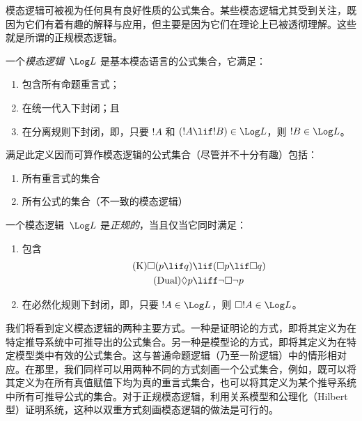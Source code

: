 \documentclass[../../../include/open-logic-section]{subfiles}
\begin{document}


模态逻辑可被视为任何具有良好性质的公式集合。某些模态逻辑尤其受到关注，既因为它们有着有趣的解释与应用，但主要是因为它们在理论上已被透彻理解。这些就是所谓的正规模态逻辑。

\begin{defn}
一个\emph{模态逻辑}~$\Log L$ 是基本模态语言的公式集合，它满足：
\begin{enumerate}
\item 包含所有命题重言式；
\item 在统一代入下封闭；且
\item 在分离规则下封闭，即，只要 $!A$ 和 $(!A \lif !B) \in \Log L$，则 $!B \in \Log L$。
\end{enumerate}
\end{defn}

\begin{ex}
满足此定义因而可算作模态逻辑的公式集合（尽管并不十分有趣）包括：
\begin{enumerate}
\item 所有重言式的集合
\item 所有公式的集合（不一致的模态逻辑）
\end{enumerate}
\end{ex}

\begin{defn}\label{defn:normal-modal-logic}
一个模态逻辑~$\Log L$ 是\emph{正规的}，当且仅当它同时满足：
\begin{enumerate}
\item 包含
\begin{align}
\tag{K} \Box(p \lif q) & \lif (\Box p \lif \Box q) \\
\tag{Dual} \Diamond p & \liff \lnot \Box \lnot p
\end{align}
\item 在必然化规则下封闭，即，只要 $!A \in \Log L$，则 $\Box !A \in \Log L$。
\end{enumerate}
\end{defn}

我们将看到定义模态逻辑的两种主要方式。一种是证明论的方式，即将其定义为在特定推导系统中可推导出的公式集合。另一种是模型论的方式，即将其定义为在特定模型类中有效的公式集合。这与普通命题逻辑（乃至一阶逻辑）中的情形相对应。在那里，我们同样可以用两种不同的方式刻画一个公式集合，例如，既可以将其定义为在所有真值赋值下均为真的重言式集合，也可以将其定义为某个推导系统中所有可推导公式的集合。对于正规模态逻辑，利用关系模型和公理化（Hilbert型）证明系统，这种以双重方式刻画模态逻辑的做法是可行的。
\end{document}
